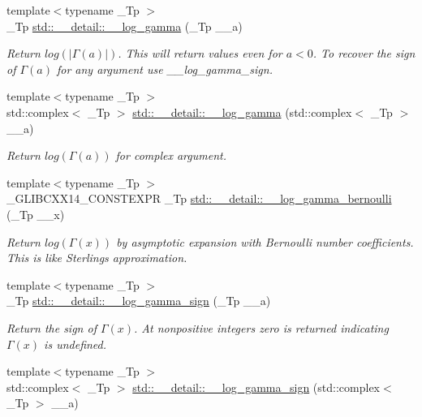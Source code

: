 \begin{DoxyCompactItemize}
{\footnotesize template$<$typename \+\_\+\+Tp $>$ }\\\+\_\+\+Tp \hyperlink{namespacestd_1_1____detail_af6c4c0192a07f467fd9ddeebb28a34d4}{std\+::\+\_\+\+\_\+detail\+::\+\_\+\+\_\+log\+\_\+gamma} (\+\_\+\+Tp \+\_\+\+\_\+a)
\begin{DoxyCompactList}\small\item\em Return $ log(|\Gamma(a)|) $. This will return values even for $ a < 0 $. To recover the sign of $ \Gamma(a) $ for any argument use {\itshape \+\_\+\+\_\+log\+\_\+gamma\+\_\+sign}. \end{DoxyCompactList}\item 
{\footnotesize template$<$typename \+\_\+\+Tp $>$ }\\std\+::complex$<$ \+\_\+\+Tp $>$ \hyperlink{namespacestd_1_1____detail_ad37ad67a4b856eb97b13c8844f9ef8d8}{std\+::\+\_\+\+\_\+detail\+::\+\_\+\+\_\+log\+\_\+gamma} (std\+::complex$<$ \+\_\+\+Tp $>$ \+\_\+\+\_\+a)
\begin{DoxyCompactList}\small\item\em Return $ log(\Gamma(a)) $ for complex argument. \end{DoxyCompactList}\item 
{\footnotesize template$<$typename \+\_\+\+Tp $>$ }\\\+\_\+\+G\+L\+I\+B\+C\+X\+X14\+\_\+\+C\+O\+N\+S\+T\+E\+X\+PR \+\_\+\+Tp \hyperlink{namespacestd_1_1____detail_ac13e31ebcd3c99d6a7cad9010e039315}{std\+::\+\_\+\+\_\+detail\+::\+\_\+\+\_\+log\+\_\+gamma\+\_\+bernoulli} (\+\_\+\+Tp \+\_\+\+\_\+x)
\begin{DoxyCompactList}\small\item\em Return $log(\Gamma(x))$ by asymptotic expansion with Bernoulli number coefficients. This is like Sterling\textquotesingle{}s approximation. \end{DoxyCompactList}\item 
{\footnotesize template$<$typename \+\_\+\+Tp $>$ }\\\+\_\+\+Tp \hyperlink{namespacestd_1_1____detail_ab17ef141874b20a302d5c142cf304542}{std\+::\+\_\+\+\_\+detail\+::\+\_\+\+\_\+log\+\_\+gamma\+\_\+sign} (\+\_\+\+Tp \+\_\+\+\_\+a)
\begin{DoxyCompactList}\small\item\em Return the sign of $ \Gamma(x) $. At nonpositive integers zero is returned indicating $ \Gamma(x) $ is undefined. \end{DoxyCompactList}\item 
{\footnotesize template$<$typename \+\_\+\+Tp $>$ }\\std\+::complex$<$ \+\_\+\+Tp $>$ \hyperlink{namespacestd_1_1____detail_a4c87b679d9fa1ac20ebe3cb85becb266}{std\+::\+\_\+\+\_\+detail\+::\+\_\+\+\_\+log\+\_\+gamma\+\_\+sign} (std\+::complex$<$ \+\_\+\+Tp $>$ \+\_\+\+\_\+a)

\end{DoxyCompactItemize}
